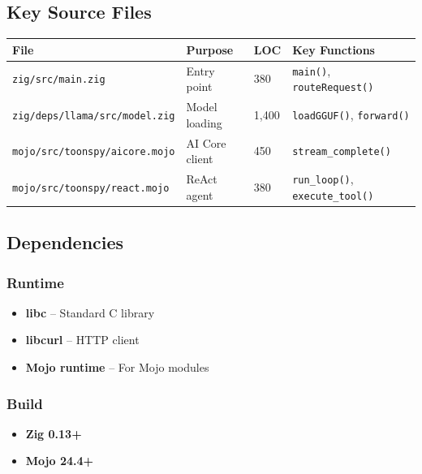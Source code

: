 \documentclass[11pt,a4paper]{article}
\begin{document}
\subsection{Key Source Files}

\begin{tabular}{@{}L{5.5cm}L{3cm}L{1.5cm}L{3.5cm}@{}}
\toprule
\textbf{File} & \textbf{Purpose} & \textbf{LOC} & \textbf{Key Functions} \\
\midrule
\texttt{zig/src/main.zig} & Entry point & 380 & \texttt{main()}, \texttt{routeRequest()} \\
\texttt{zig/deps/llama/src/model.zig} & Model loading & 1,400 & \texttt{loadGGUF()}, \texttt{forward()} \\
\texttt{mojo/src/toonspy/aicore.mojo} & AI Core client & 450 & \texttt{stream\_complete()} \\
\texttt{mojo/src/toonspy/react.mojo} & ReAct agent & 380 & \texttt{run\_loop()}, \texttt{execute\_tool()} \\
\bottomrule
\end{tabular}

\subsection{Dependencies}

\subsubsection{Runtime}
\begin{itemize}[noitemsep]
    \item \textbf{libc} -- Standard C library
    \item \textbf{libcurl} -- HTTP client
    \item \textbf{Mojo runtime} -- For Mojo modules
\end{itemize}

\subsubsection{Build}
\begin{itemize}[noitemsep]
    \item \textbf{Zig 0.13+}
    \item \textbf{Mojo 24.4+}
\end{itemize}

\newpage

\end{document}
